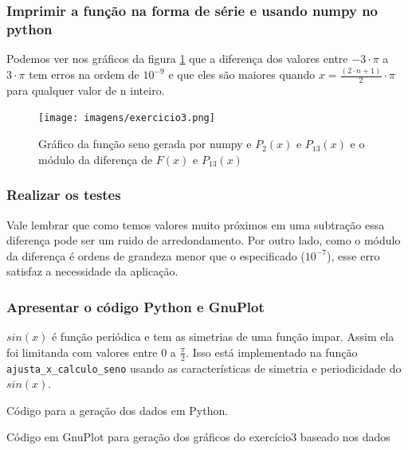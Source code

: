 \subsubsection{Imprimir a função na forma de série e usando numpy no python}

Podemos ver nos gráficos da figura \ref{fig:grafico_exe3} que a diferença dos valores entre $-3 \cdot \pi$ a $3 \cdot \pi$ tem erros na ordem de $10^{-9}$ e que eles são maiores quando $ x = \frac{(2 \cdot n + 1)}{2} \cdot \pi $ para qualquer valor de n inteiro.
\begin{figure}[H]
    \centering
    \texttt{[image: imagens/exercicio3.png]}
    \caption{Gráfico da função seno gerada por numpy e $P_2(x)$ e $P_{13}(x)$ e o módulo da diferença de $F(x)$ e $P_{13}(x)$}
    \label{fig:grafico_exe3}
\end{figure}


\subsubsection{Realizar os testes}



Vale lembrar que como temos valores muito próximos em uma subtração essa diferença pode ser um ruido de arredondamento.
Por outro lado, como o módulo da diferença é ordens de grandeza menor que o especificado ($10^{-7}$), esse erro satisfaz a necessidade da aplicação.\\

\subsubsection{Apresentar o código Python e GnuPlot}
\label{sec:caracteristicas-funcao-sin}
$sin(x)$ é função periódica e tem as simetrias de uma função impar. Assim ela foi limitanda com valores entre $0$ a $\frac{\pi}{2}$.
Isso está implementado na função \texttt{ajusta\_x\_calculo\_seno} usando as características de simetria e periodicidade do $sin(x)$.


Código para a geração dos dados em Python.

\newpage

Código em GnuPlot para geração dos gráficos do exercício3 baseado nos dados


\newpage





